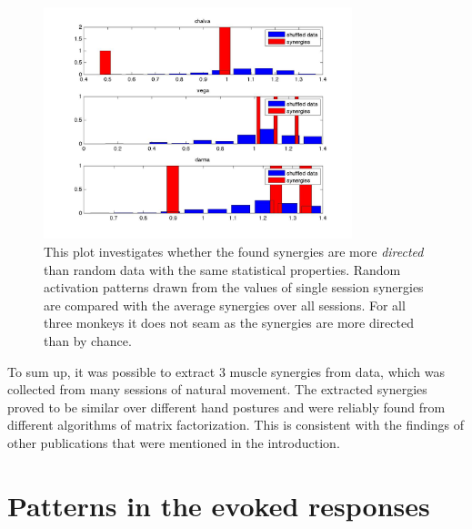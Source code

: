 \begin{figure}[ht]
    \centering
        \includegraphics[width=0.8\textwidth]{images/circ_std_syns.jpg}
    \caption{This plot investigates whether the found synergies are more \emph{directed} than random data with the same statistical properties. Random activation patterns drawn from the values of single session synergies are compared with the average synergies over all sessions. For all three monkeys it does not seam as the synergies are more directed than by chance.}
    \label{sg:fig:images_circ_std_syns}
\end{figure}

To sum up, it was possible to extract 3 muscle synergies from data, which was collected from many sessions of natural movement. The extracted synergies proved to be similar over different hand postures and were reliably found from different algorithms of matrix factorization. This is consistent with the findings of other publications that were mentioned in the introduction.



\clearpage



\section{Patterns in the evoked responses} %
\label{sg:sec:evoked_syns}

